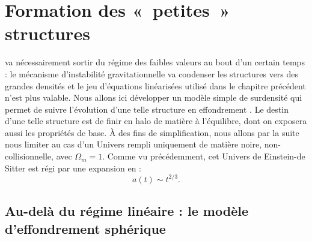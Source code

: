 \chapter{Formation des « petites » structures}
 va nécessairement sortir du régime des faibles valeurs au bout d'un certain temps : le mécanisme d'instabilité gravitationnelle va condenser les structures vers des grandes densités et le jeu d'équations linéarisées utilisé dans le chapitre précédent n'est plus valable. Nous allons ici développer un modèle simple de surdensité qui permet de suivre l'évolution d'une telle structure en effondrement . Le destin d'une telle structure est de finir en halo de matière à l'équilibre, dont on exposera aussi les propriétés de base. À des fins de simplification, nous allons par la suite nous limiter au cas d'un Univers rempli uniquement de matière noire, non-collisionnelle, avec $\Omega_m=1$. Comme vu précédemment, cet Univers de Einstein-de Sitter est régi par une expansion en :
\begin{equation}
a(t) \sim t^{2/3}.
\end{equation}

\section{Au-delà du régime linéaire : le modèle d'effondrement sphérique}

